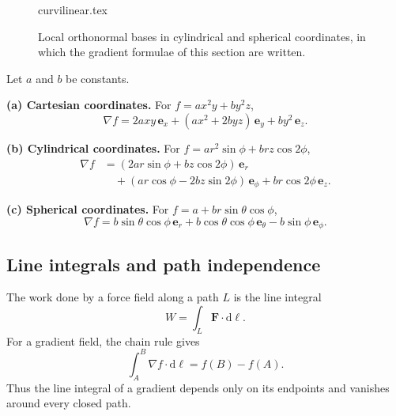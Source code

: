 \begin{figure}[htb]
    \centering
    {curvilinear.tex}
    \caption{Local orthonormal bases in cylindrical and spherical coordinates, in which the gradient formulae of this section are written.}
    \label{fig:vec-curvilinear}
\end{figure}

\begin{example}
Let $a$ and $b$ be constants.

\textbf{(a) Cartesian coordinates.} For $f=ax^2y+by^2z$,
\begin{equation}
\nabla f=2axy\,\mathbf{e}_x+(ax^2+2byz)\,\mathbf{e}_y+by^2\,\mathbf{e}_z.
\end{equation}

\textbf{(b) Cylindrical coordinates.} For
$f=ar^2\sin\phi+ brz\cos 2\phi$,
\begin{equation}
\begin{aligned}
\nabla f
&=(2ar\sin\phi+bz\cos2\phi)\,\mathbf{e}_r\\
&\quad +(ar\cos\phi-2bz\sin2\phi)\,\mathbf{e}_\phi
+br\cos2\phi\,\mathbf{e}_z.
\end{aligned}
\end{equation}

\textbf{(c) Spherical coordinates.} For
$f=a+br\sin\theta\cos\phi$,
\begin{equation}
\nabla f=b\sin\theta\cos\phi\,\mathbf{e}_r
+b\cos\theta\cos\phi\,\mathbf{e}_\theta
-b\sin\phi\,\mathbf{e}_\phi.
\end{equation}
\end{example}

\subsection{Line integrals and path independence}
The work done by a force field along a path $L$ is the line integral
\begin{equation}
W=\int_L\mathbf{F}\cdot\mathrm{d}\boldsymbol{\ell}.
\end{equation}
For a gradient field, the chain rule gives
\begin{equation}
\int_A^B\nabla f\cdot\mathrm{d}\boldsymbol{\ell}=f(B)-f(A).
\end{equation}
Thus the line integral of a gradient depends only on its endpoints and vanishes around every closed path.

